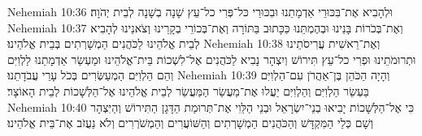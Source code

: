 Nehemiah 10:36	וּלְהָבִיא אֶת־בִּכּוּרֵי אַדְמָתֵנוּ וּבִכּוּרֵי כּל־פְּרִי כל־עֵץ שָׁנָה בְשָׁנָה לְבֵית יְהֹוָה׃
Nehemiah 10:37	וְאֶת־בְּכֹרוֹת בָּנֵינוּ וּבְהֶמְתֵּנוּ כַּכָּתוּב בַּתּוֹרָה וְאֶת־בְּכוֹרֵי בְקָרֵינוּ וְצֹאנֵינוּ לְהָבִיא לְבֵית אֱלֹהֵינוּ לַכֹּהֲנִים הַמְשָׁרְתִים בְּבֵית אֱלֹהֵינוּ׃
Nehemiah 10:38	וְאֶת־רֵאשִׁית עֲרִיסֹתֵינוּ וּתְרוּמֹתֵינוּ וּפְרִי כל־עֵץ תִּירוֹשׁ וְיִצְהָר נָבִיא לַכֹּהֲנִים אֶל־לִשְׁכוֹת בֵּית־אֱלֹהֵינוּ וּמַעְשַׂר אַדְמָתֵנוּ לַלְוִיִּם וְהֵם הַלְוִיִּם הַמְעַשְּׂרִים בְּכֹל עָרֵי עֲבֹדָתֵנוּ׃
Nehemiah 10:39	וְהָיָה הַכֹּהֵן בֶּן־אַהֲרֹן עִם־הַלְוִיִּם בַּעְשֵׂר הַלְוִיִּם וְהַלְוִיִּם יַעֲלוּ אֶת־מַעֲשַׂר הַמַּעֲשֵׂר לְבֵית אֱלֹהֵינוּ אֶל־הַלְּשָׁכוֹת לְבֵית הָאוֹצָר׃
Nehemiah 10:40	כִּי אֶל־הַלְּשָׁכוֹת יָבִיאוּ בְנֵי־יִשְׂרָאֵל וּבְנֵי הַלֵּוִי אֶת־תְּרוּמַת הַדָּגָן הַתִּירוֹשׁ וְהַיִּצְהָר וְשָׁם כְּלֵי הַמִּקְדָּשׁ וְהַכֹּהֲנִים הַמְשָׁרְתִים וְהַשּׁוֹעֲרִים וְהַמְשֹׁרְרִים וְלֹא נַעֲזֹב אֶת־בֵּית אֱלֹהֵינוּ׃
